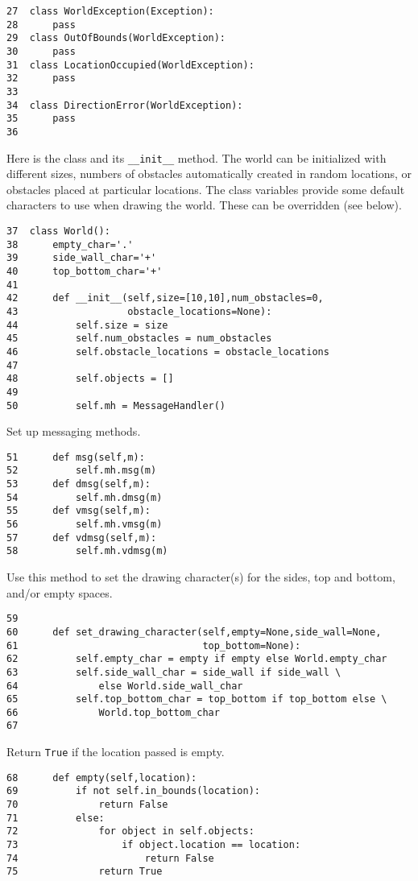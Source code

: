 \documentclass[11pt]{tufte-handout}
\begin{document}
\begin{verbatim}
27  class WorldException(Exception):
28      pass
29  class OutOfBounds(WorldException):
30      pass
31  class LocationOccupied(WorldException):
32      pass
33  
34  class DirectionError(WorldException):
35      pass
36  
\end{verbatim}



Here is the class and its \texttt{\_\_init\_\_} method.  The world can be initialized with different sizes, numbers of obstacles automatically created in random locations, or obstacles placed at particular locations.  The class variables provide some default characters to use when drawing the world.  These can be overridden (see below).

\begin{verbatim}
37  class World():
38      empty_char='.'
39      side_wall_char='+'
40      top_bottom_char='+'
41  
42      def __init__(self,size=[10,10],num_obstacles=0,
43                   obstacle_locations=None):
44          self.size = size
45          self.num_obstacles = num_obstacles
46          self.obstacle_locations = obstacle_locations
47  
48          self.objects = []
49  
50          self.mh = MessageHandler()
\end{verbatim}

Set up messaging methods.

\begin{verbatim}
51      def msg(self,m):
52          self.mh.msg(m)
53      def dmsg(self,m):
54          self.mh.dmsg(m)
55      def vmsg(self,m):
56          self.mh.vmsg(m)
57      def vdmsg(self,m):
58          self.mh.vdmsg(m)
\end{verbatim}

Use this method to set the drawing character(s) for the sides, top and bottom, and/or empty spaces.
\begin{verbatim}
59  
60      def set_drawing_character(self,empty=None,side_wall=None,
61                                top_bottom=None):
62          self.empty_char = empty if empty else World.empty_char
63          self.side_wall_char = side_wall if side_wall \
64              else World.side_wall_char
65          self.top_bottom_char = top_bottom if top_bottom else \
66              World.top_bottom_char
67  
\end{verbatim}

Return \texttt{True} if the location passed is empty.

\begin{verbatim}
68      def empty(self,location):
69          if not self.in_bounds(location):
70              return False
71          else:
72              for object in self.objects:
73                  if object.location == location:
74                      return False
75              return True
\end{verbatim}
\end{document}
